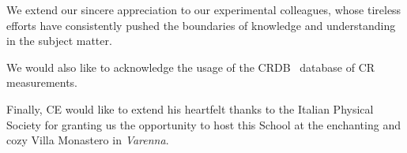 \documentclass[varenna]{cimento}
\begin{document}
We extend our sincere appreciation to our experimental colleagues, whose tireless efforts have consistently pushed the boundaries of knowledge and understanding in the subject matter. 

We would also like to acknowledge the usage of the CRDB~\cite{Maurin2023} database of CR measurements. 

Finally, CE would like to extend his heartfelt thanks to the Italian Physical Society for granting us the opportunity to host this School at the enchanting and cozy Villa Monastero in \emph{Varenna}.
%



\end{document}
